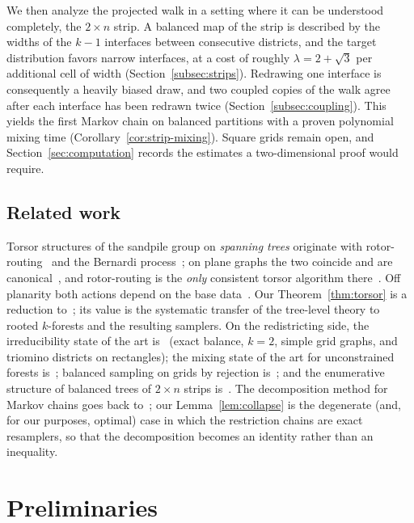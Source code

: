 \documentclass[11pt]{article}
\begin{document}
We then analyze the projected walk in a setting where it can be
understood completely, the $2 \times n$ strip. A balanced map of the
strip is described by the widths of the $k-1$ interfaces between
consecutive districts, and the target distribution favors narrow
interfaces, at a cost of roughly $\lambda = 2 + \sqrt3$ per additional
cell of width (Section~\ref{subsec:strips}). Redrawing one interface is
consequently a heavily biased draw, and two coupled copies of the walk
agree after each interface has been redrawn twice
(Section~\ref{subsec:coupling}). This yields the first Markov chain on
balanced partitions with a proven polynomial mixing time
(Corollary~\ref{cor:strip-mixing}). Square grids remain open, and
Section~\ref{sec:computation} records the estimates a two-dimensional
proof would require.

\subsection{Related work}

Torsor structures of the sandpile group on \emph{spanning trees} originate
with rotor-routing~\cite{holroyd2008chip} and the Bernardi
process~\cite{baker2018bernardi}; on plane graphs the two coincide and are
canonical~\cite{baker2018bernardi, chan2015rotor}, and rotor-routing is the
\emph{only} consistent torsor algorithm there~\cite{ganguly2023rotor}. Off
planarity both actions depend on the base data~\cite{shokrieh2021torsor}.
Our Theorem~\ref{thm:torsor} is a reduction to~\cite{holroyd2008chip}; its
value is the systematic transfer of the tree-level theory to rooted
$k$-forests and the resulting samplers. On the redistricting side, the
irreducibility state of the art is~\cite{akitaya2026bud} (exact balance,
$k = 2$, simple grid graphs, and triomino districts on rectangles); the
mixing state of the art for unconstrained forests
is~\cite{anari2021logconcave}; balanced sampling on grids by rejection
is~\cite{cannon2024balanced}; and the enumerative structure of balanced
trees of $2 \times n$ strips is~\cite{gallagher2025balanced}. The
decomposition method for Markov chains goes back
to~\cite{madras2002decomposition}; our Lemma~\ref{lem:collapse} is the
degenerate (and, for our purposes, optimal) case in which the
restriction chains are exact resamplers, so that the decomposition becomes an
identity rather than an inequality.

\section{Preliminaries}
\label{sec:prelim}
\end{document}
